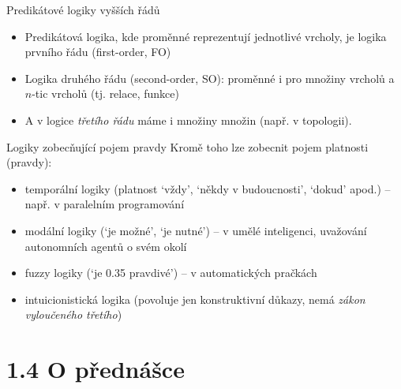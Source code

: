 \documentclass{beamer}
\begin{document}
\begin{frame}{Predikátové logiky vyšších řádů}

    \begin{itemize}
        \item Predikátová logika, kde proměnné reprezentují jednotlivé vrcholy, je logika \alert{prvního řádu} (\alert{first-order}, \alert{FO})
        \item Logika \alert{druhého řádu} (\alert{second-order}, \alert{SO}): proměnné i pro množiny vrcholů a $n$-tic vrcholů (tj. relace, funkce)
        \smallskip

        \item A v logice \emph{třetího řádu} máme i množiny množin (např. v topologii).
    \end{itemize}

\end{frame}


\begin{frame}{Logiky zobecňující pojem pravdy}
    Kromě toho lze zobecnit pojem platnosti (pravdy):
    
    \begin{itemize}        
        \item \alert{temporální logiky} (platnost `vždy', `někdy v budoucnosti', `dokud' apod.) -- např. v paralelním programování
        \item \alert{modální logiky} (`je možné', `je nutné') -- v umělé inteligenci, uvažování autonomních agentů o svém okolí
        \item \alert{fuzzy logiky} (`je 0.35 pravdivé') -- v automatických pračkách
        \item \alert{intuicionistická logika} (povoluje jen konstruktivní důkazy, nemá \emph{zákon vyloučeného třetího})
    \end{itemize}
\end{frame}


\section{1.4 O přednášce}
\end{document}
